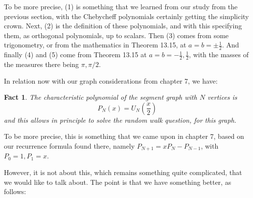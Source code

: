 \documentclass[12pt]{amsbook}
\newtheorem{comment}[theorem]{Comment}
\newtheorem{fact}[theorem]{Fact}
\begin{document}

To be more precise, (1) is something that we learned from our study from the previous section, with the Chebycheff polynomials certainly getting the simplicity crown. Next, (2) is the definition of these polynomials, and with this specifying them, as orthogonal polynomials, up to scalars. Then (3) comes from some trigonometry, or from the mathematics in Theorem 13.15, at $a=b=\pm\frac{1}{2}$. And finally (4) and (5) come from Theorem 13.15 at $a=b=-\frac{1}{2},\frac{1}{2}$, with the masses of the measures there being $\pi,\pi/2$.

\bigskip

In relation now with our graph considerations from chapter 7, we have:

\begin{fact}
The characteristic polynomial of the segment graph with $N$ vertices is
$$P_N(x)=U_N\left(\frac{x}{2}\right)$$
and this allows in principle to solve the random walk question, for this graph.
\end{fact}

To be more precise, this is something that we came upon in chapter 7, based on our recurrence formula found there, namely $P_{N+1}=xP_N-P_{N-1}$, with $P_0=1,P_1=x$.

\bigskip

However, it is not about this, which remains something quite complicated, that we would like to talk about. The point is that we have something better, as follows:
\end{document}
